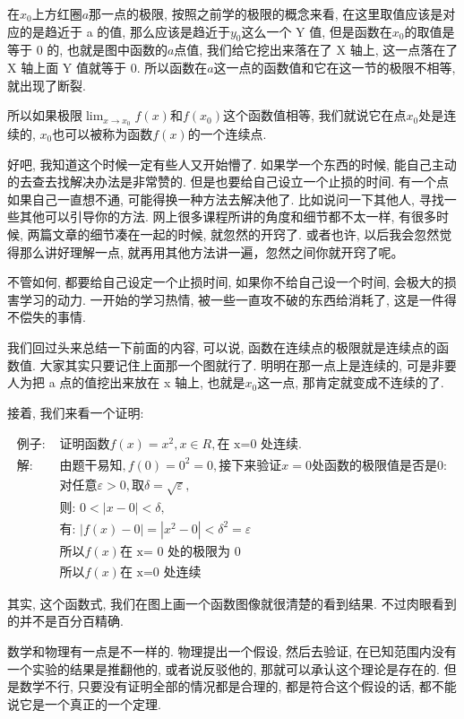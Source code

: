 在$x_0$上方红圈$a$那一点的极限, 按照之前学的极限的概念来看, 在这里取值应该是对应的是趋近于 a 的值, 那么应该是趋近于$y_0$这么一个 Y 值, 但是函数在$x_0$的取值是等于 0 的, 也就是图中函数的$a$点值, 我们给它挖出来落在了 X 轴上, 这一点落在了 X 轴上面 Y 值就等于 0. 所以函数在$a$这一点的函数值和它在这一节的极限不相等, 就出现了断裂. 

所以如果极限$\lim_{x \to x_0}f(x)$和$f(x_0)$这个函数值相等, 我们就说它在点$x_0$处是连续的, $x_0$也可以被称为函数$f(x)$的一个连续点. 

好吧, 我知道这个时候一定有些人又开始懵了. 如果学一个东西的时候, 能自己主动的去查去找解决办法是非常赞的. 但是也要给自己设立一个止损的时间. 有一个点如果自己一直想不通, 可能得换一种方法去解决他了. 比如说问一下其他人, 寻找一些其他可以引导你的方法. 网上很多课程所讲的角度和细节都不太一样, 有很多时候, 两篇文章的细节凑在一起的时候, 就忽然的开窍了. 或者也许, 以后我会忽然觉得那么讲好理解一点, 就再用其他方法讲一遍，忽然之间你就开窍了呢。

不管如何, 都要给自己设定一个止损时间, 如果你不给自己设一个时间, 会极大的损害学习的动力. 一开始的学习热情, 被一些一直攻不破的东西给消耗了, 这是一件得不偿失的事情. 

我们回过头来总结一下前面的内容, 可以说, 函数在连续点的极限就是连续点的函数值. 大家其实只要记住上面那一个图就行了. 明明在那一点上是连续的, 可是非要人为把 a 点的值挖出来放在 x 轴上, 也就是$x_0$这一点, 那肯定就变成不连续的了. 

接着, 我们来看一个证明: 

\begin{align*}
  \mbox{例子: } & \mbox{证明函数} f(x) = x^2, x \in R, \mbox{在 x=0 处连续. } \\
  \mbox{解}: & \mbox{由题干易知}, f(0) = 0^2 = 0, \mbox{接下来验证}x = 0\mbox{处函数的极限值是否是}0: \\
  & \mbox{对任意} \varepsilon > 0, \mbox{取} \delta = \sqrt {\varepsilon},  \\
  & \mbox{则: } 0 < |x-0| < \delta , \\
  & \mbox{有: } |f(x) - 0 | = | x^2 - 0| < \delta ^2 = \varepsilon \\
  & \mbox{所以} f(x)\mbox{在 x= 0 处的极限为 0} \\
  & \mbox{所以} f(x)\mbox{在 x=0 处连续}
\end{align*}

其实, 这个函数式, 我们在图上画一个函数图像就很清楚的看到结果. 不过肉眼看到的并不是百分百精确.

数学和物理有一点是不一样的. 物理提出一个假设, 然后去验证, 在已知范围内没有一个实验的结果是推翻他的, 或者说反驳他的, 那就可以承认这个理论是存在的. 但是数学不行, 只要没有证明全部的情况都是合理的, 都是符合这个假设的话, 都不能说它是一个真正的一个定理. 


